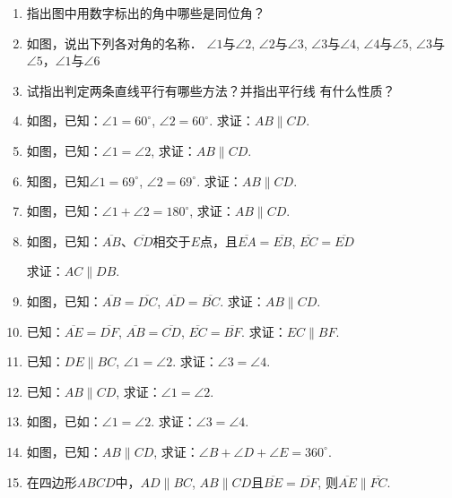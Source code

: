 \begin{ex}
\begin{enumerate}
    \item 指出图中用数字标出的角中哪些是同位角？
    \item 如图，说出下列各对角的名称．
    $\angle 1$与$\angle 2$, $\angle 2$与$\angle 3$, $\angle 3$与$\angle 4$, $\angle 4$与$\angle 5$, $\angle 3$与
    $\angle 5$，$\angle 1$与$\angle 6$
    \item 试指出判定两条直线平行有哪些方法？并指出平行线
    有什么性质？
    \item 如图，已知：$\angle 1=60^{\circ}$, $\angle 2=60^{\circ}$. 
    求证：$AB\parallel CD$.

    \item 如图，已知：$\angle 1=\angle 2$, 求证：$AB\parallel CD$.
    \item 知图，已知$\angle 1=69^{\circ}$, $\angle 2=69^{\circ}$.
    求证：$AB\parallel CD$.
    \item 如图，已知：$\angle 1+\angle 2=180^{\circ}$, 求证：$AB\parallel CD$.
    \item 如图，已知：$\overline{AB}$、$\overline{CD}$相交于$E$点，且$\overline{EA}=\overline{EB}$, $\overline{EC}=\overline{ED}$
    
求证：$AC\parallel DB$.

\item 如图，已知：$\overline{AB}=\overline{DC}$, $\overline{AD}=\overline{BC}$. 求证：$AB\parallel CD$.
\item 已知：$\overline{AE}=\overline{DF}$, $\overline{AB}=\overline{CD}$, $\overline{EC}=\overline{BF}$. 
求证：$EC\parallel BF$.
\item 已知：$DE\parallel BC$, $\angle 1=\angle 2$. 求证：$\angle 3=\angle 4$.
\item 已知：$AB\parallel CD$, 求证：$\angle 1=\angle 2$.
\item 如图，已如：$\angle 1=\angle 2$. 求证：$\angle 3=\angle 4$.
\item 如图，已知：$AB\parallel CD$, 
求证：$\angle B+\angle D+\angle E=360^{\circ}$.

\item 在四边形$ABCD$中，$AD\parallel BC$, $AB\parallel CD$且$\overline{BE}=\overline{DF}$, 则$\overline{AE}\parallel \overline{FC}$.
\end{enumerate}
\end{ex}


